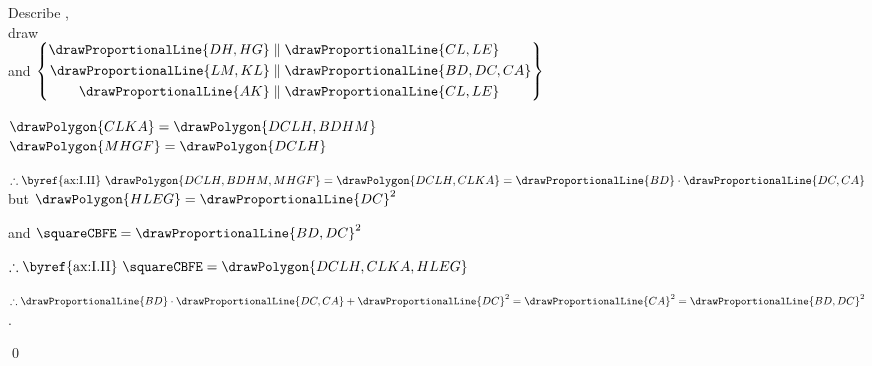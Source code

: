 \documentclass[booklanguage=english]{byrnebook}
\begin{document}
\begin{center}
Describe  ,\\
draw \\
and $\left\{
	\begin{aligned}
		\drawProportionalLine{DH,HG} & \parallel \drawProportionalLine{CL,LE} \\
		\drawProportionalLine{LM,KL} & \parallel \drawProportionalLine{BD,DC,CA} \\
		\drawProportionalLine{AK} & \parallel \drawProportionalLine{CL,LE}\\
	\end{aligned}
\right\}$ 

$\drawPolygon{CLKA} = \drawPolygon{DCLH,BDHM}$ \\
$\drawPolygon{MHGF} = \drawPolygon{DCLH}$ 

$\therefore \mbox{\byref{ax:I.II} } \drawPolygon{DCLH,BDHM,MHGF} = \drawPolygon{DCLH,CLKA} = \drawProportionalLine{BD} \cdot \drawProportionalLine{DC,CA}$
but $\drawPolygon{HLEG} = \drawProportionalLine{DC}^2$ 

and $\squareCBFE = \drawProportionalLine{BD,DC}^2$ \byref{\constref}

$\therefore \mbox{\byref{ax:I.II} } \squareCBFE = \drawPolygon{DCLH,CLKA,HLEG}$

$\therefore \drawProportionalLine{BD} \cdot \drawProportionalLine{DC,CA} + \drawProportionalLine{DC}^2 = \drawProportionalLine{CA}^2 = \drawProportionalLine{BD,DC}^2$.
\end{center}

\qed
\end{document}
